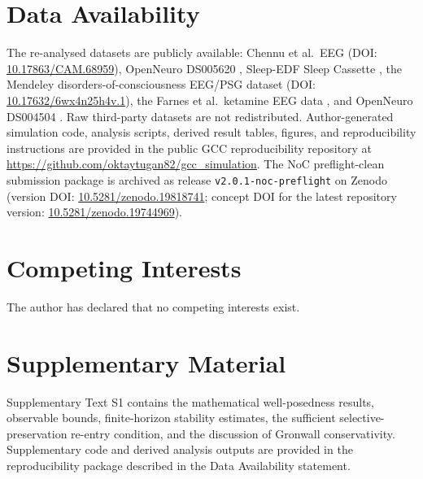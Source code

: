 \documentclass[11pt,a4paper]{article}
\theoremstyle{plain}
\theoremstyle{definition}
\theoremstyle{remark}
\begin{document}
\section*{Data Availability}

The re-analysed datasets are publicly available: Chennu et al.\ EEG \citep{chennu2016} (DOI: \href{https://doi.org/10.17863/CAM.68959}{10.17863/CAM.68959}), OpenNeuro DS005620 \citep{bajwa2024ds005620}, Sleep-EDF Sleep Cassette \citep{kemp2000}, the Mendeley disorders-of-consciousness EEG/PSG dataset (DOI: \href{https://doi.org/10.17632/6wx4n25h4v.1}{10.17632/6wx4n25h4v.1}), the Farnes et al.\ ketamine EEG data \citep{farnes2020}, and OpenNeuro DS004504 \citep{miltiadous2023ds004504}. Raw third-party datasets are not redistributed. Author-generated simulation code, analysis scripts, derived result tables, figures, and reproducibility instructions are provided in the public GCC reproducibility repository at \url{https://github.com/oktaytugan82/gcc_simulation}. The NoC preflight-clean submission package is archived as release \texttt{v2.0.1-noc-preflight} on Zenodo (version DOI: \href{https://doi.org/10.5281/zenodo.19818741}{10.5281/zenodo.19818741}; concept DOI for the latest repository version: \href{https://doi.org/10.5281/zenodo.19744969}{10.5281/zenodo.19744969}).

\section*{Competing Interests}

The author has declared that no competing interests exist.

\section*{Supplementary Material}

Supplementary Text S1 contains the mathematical well-posedness results, observable bounds, finite-horizon stability estimates, the sufficient selective-preservation re-entry condition, and the discussion of Gronwall conservativity. Supplementary code and derived analysis outputs are provided in the reproducibility package described in the Data Availability statement.
\end{document}
